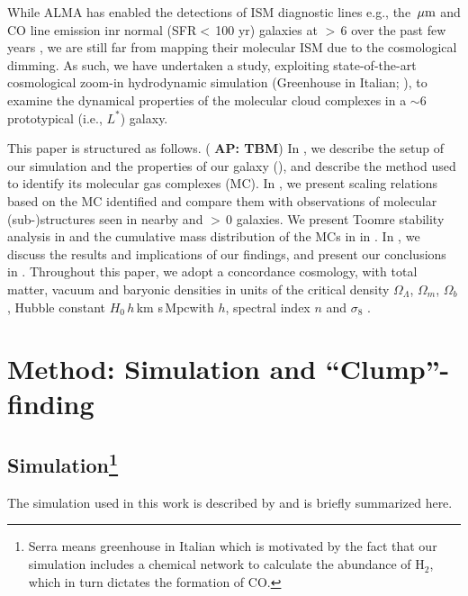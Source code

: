 \documentclass[iop]{emulateapj}
\newcommand{\AP}[1]{({\bf \color{apcolor} AP: #1})}
\begin{document}
While ALMA has enabled the detections of
ISM diagnostic lines e.g., the \,$\mbox{$\mu$m}$ and CO line emission inr
normal (SFR$<$\,100\,\Msun\,yr\pmOne) galaxies at \z$>$\,6 over the past few years \citep[e.g.,][]{Odorico18a, Carniani18b},
we are still far from mapping their molecular ISM due to the cosmological dimming.
As such, we have undertaken a study, exploiting
state-of-the-art cosmological zoom-in hydrodynamic simulation
 (Greenhouse in Italian; \citealt{Pallottini17a, Pallottini17b}), to examine
the dynamical properties of the molecular cloud complexes in a \z$\sim$6 prototypical (i.e., $L^*$) 
galaxy.

This paper is structured as follows.
\AP{TBM}
In , we describe the setup of our simulation and the properties of our galaxy (\flower),
and describe the method used to identify its molecular gas complexes (MC).
In , we present scaling relations based on
the MC identified and compare them with observations of molecular
(sub-)structures seen in nearby and \z$>$\,0 galaxies.
We present Toomre stability analysis in  and
the cumulative mass distribution of the MCs in \flower in .
In , we discuss the results and implications of our findings,
and present our conclusions in .
Throughout this paper, we adopt a concordance cosmology, with total matter, vacuum and baryonic densities
in units of the critical density $\Omega_{\Lambda}$, $\Omega_m$, $\Omega_b$,
Hubble constant $H_0$\,$h$\,km s\pmOne\,Mpc\pmOne with $h$,
spectral index $n$ and $\sigma_8$ \citep{Planck14a}.


\section{Method: Simulation and ``Clump''-finding} \label{sec:sim}


\subsection{ Simulation\footnote{Serra means greenhouse in Italian which is motivated by the
fact that our simulation includes a chemical network to calculate the abundance of H$_2$, which in turn
dictates the formation of CO.
}}
The simulation used in this work is described by \citealt{Pallottini17a, Pallottini17b} and is briefly summarized here.
\end{document}
